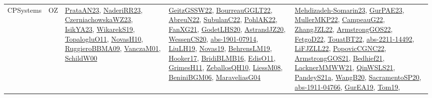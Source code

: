 {\begin{longtable}{lp{3cm}>{\raggedright}p{6cm}>{\raggedright}p{6cm}p{8cm}}
CPSystems & OZ & \href{articles/PrataAN23.pdf}{PrataAN23}\cite{PrataAN23}, \href{articles/NaderiRR23.pdf}{NaderiRR23}\cite{NaderiRR23}, \href{articles/CzerniachowskaWZ23.pdf}{CzerniachowskaWZ23}\cite{CzerniachowskaWZ23}, \href{articles/IsikYA23.pdf}{IsikYA23}\cite{IsikYA23}, \href{articles/WikarekS19.pdf}{WikarekS19}\cite{WikarekS19}, \href{articles/TopalogluO11.pdf}{TopalogluO11}\cite{TopalogluO11}, \href{articles/NovasH10.pdf}{NovasH10}\cite{NovasH10}, \href{articles/RuggieroBBMA09.pdf}{RuggieroBBMA09}\cite{RuggieroBBMA09}, \href{papers/VanczaM01.pdf}{VanczaM01}\cite{VanczaM01}, \href{articles/SchildW00.pdf}{SchildW00}\cite{SchildW00} & \href{papers/GeitzGSSW22.pdf}{GeitzGSSW22}\cite{GeitzGSSW22}, \href{articles/BourreauGGLT22.pdf}{BourreauGGLT22}\cite{BourreauGGLT22}, \href{articles/AbreuN22.pdf}{AbreuN22}\cite{AbreuN22}, \href{articles/SubulanC22.pdf}{SubulanC22}\cite{SubulanC22}, \href{articles/PohlAK22.pdf}{PohlAK22}\cite{PohlAK22}, \href{articles/FanXG21.pdf}{FanXG21}\cite{FanXG21}, \href{papers/GodetLHS20.pdf}{GodetLHS20}\cite{GodetLHS20}, \href{articles/AstrandJZ20.pdf}{AstrandJZ20}\cite{AstrandJZ20}, \href{papers/WessenCS20.pdf}{WessenCS20}\cite{WessenCS20}, \href{articles/abs-1901-07914.pdf}{abs-1901-07914}\cite{abs-1901-07914}, \href{papers/LiuLH19.pdf}{LiuLH19}\cite{LiuLH19}, \href{articles/Novas19.pdf}{Novas19}\cite{Novas19}, \href{papers/BehrensLM19.pdf}{BehrensLM19}\cite{BehrensLM19}, \href{papers/Hooker17.pdf}{Hooker17}\cite{Hooker17}, \href{articles/BridiBLMB16.pdf}{BridiBLMB16}\cite{BridiBLMB16}, \href{papers/EdisO11.pdf}{EdisO11}\cite{EdisO11}, \href{papers/GrimesH11.pdf}{GrimesH11}\cite{GrimesH11}, \href{articles/ZeballosQH10.pdf}{ZeballosQH10}\cite{ZeballosQH10}, \href{articles/LiessM08.pdf}{LiessM08}\cite{LiessM08}, \href{papers/BeniniBGM06.pdf}{BeniniBGM06}\cite{BeniniBGM06}, \href{papers/MaraveliasG04.pdf}{MaraveliasG04}\cite{MaraveliasG04} & \href{papers/Mehdizadeh-Somarin23.pdf}{Mehdizadeh-Somarin23}\cite{Mehdizadeh-Somarin23}, \href{articles/GurPAE23.pdf}{GurPAE23}\cite{GurPAE23}, \href{articles/MullerMKP22.pdf}{MullerMKP22}\cite{MullerMKP22}, \href{articles/CampeauG22.pdf}{CampeauG22}\cite{CampeauG22}, \href{papers/ZhangJZL22.pdf}{ZhangJZL22}\cite{ZhangJZL22}, \href{papers/ArmstrongGOS22.pdf}{ArmstrongGOS22}\cite{ArmstrongGOS22}, \href{articles/FetgoD22.pdf}{FetgoD22}\cite{FetgoD22}, \href{papers/TouatBT22.pdf}{TouatBT22}\cite{TouatBT22}, \href{articles/abs-2211-14492.pdf}{abs-2211-14492}\cite{abs-2211-14492}, \href{papers/LiFJZLL22.pdf}{LiFJZLL22}\cite{LiFJZLL22}, \href{papers/PopovicCGNC22.pdf}{PopovicCGNC22}\cite{PopovicCGNC22}, \href{papers/ArmstrongGOS21.pdf}{ArmstrongGOS21}\cite{ArmstrongGOS21}, \href{articles/Bedhief21.pdf}{Bedhief21}\cite{Bedhief21}, \href{papers/LacknerMMWW21.pdf}{LacknerMMWW21}\cite{LacknerMMWW21}, \href{articles/QinWSLS21.pdf}{QinWSLS21}\cite{QinWSLS21}, \href{articles/PandeyS21a.pdf}{PandeyS21a}\cite{PandeyS21a}, \href{papers/WangB20.pdf}{WangB20}\cite{WangB20}, \href{articles/SacramentoSP20.pdf}{SacramentoSP20}\cite{SacramentoSP20}, \href{articles/abs-1911-04766.pdf}{abs-1911-04766}\cite{abs-1911-04766}, \href{articles/GurEA19.pdf}{GurEA19}\cite{GurEA19}, \href{papers/Tom19.pdf}{Tom19}\cite{Tom19}, 
\end{longtable}}

